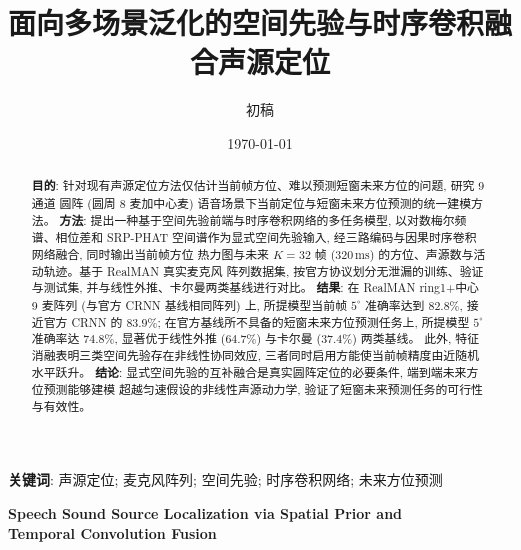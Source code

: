 \documentclass[UTF8,a4paper,11pt]{ctexart}
\title{面向多场景泛化的空间先验与时序卷积融合声源定位}
\author{初稿}
\date{\today}
\begin{document}
\maketitle

\begin{abstract}
\textbf{目的}: 针对现有声源定位方法仅估计当前帧方位、难以预测短窗未来方位的问题, 研究 9 通道
圆阵 (圆周 8 麦加中心麦) 语音场景下当前定位与短窗未来方位预测的统一建模方法。
\textbf{方法}: 提出一种基于空间先验前端与时序卷积网络的多任务模型, 以对数梅尔频谱、相位差和
SRP-PHAT 空间谱作为显式空间先验输入, 经三路编码与因果时序卷积网络融合, 同时输出当前帧方位
热力图与未来 $K{=}32$ 帧 ($320\,\mathrm{ms}$) 的方位、声源数与活动轨迹。基于 RealMAN 真实麦克风
阵列数据集, 按官方协议划分无泄漏的训练、验证与测试集, 并与线性外推、卡尔曼两类基线进行对比。
\textbf{结果}: 在 RealMAN ring1+中心 9 麦阵列 (与官方 CRNN 基线相同阵列) 上, 所提模型当前帧
$5^\circ$ 准确率达到 $82.8\%$, 接近官方 CRNN 的 $83.9\%$; 在官方基线所不具备的短窗未来方位预测任务上,
所提模型 $5^\circ$ 准确率达 $74.8\%$, 显著优于线性外推 ($64.7\%$) 与卡尔曼 ($37.4\%$) 两类基线。
此外, 特征消融表明三类空间先验存在非线性协同效应, 三者同时启用方能使当前帧精度由近随机水平跃升。
\textbf{结论}: 显式空间先验的互补融合是真实圆阵定位的必要条件, 端到端未来方位预测能够建模
超越匀速假设的非线性声源动力学, 验证了短窗未来预测任务的可行性与有效性。
\end{abstract}

\noindent\textbf{关键词}: 声源定位; 麦克风阵列; 空间先验; 时序卷积网络; 未来方位预测

\vspace{0.5em}
\begin{center}
\textbf{Speech Sound Source Localization via Spatial Prior and\\Temporal Convolution Fusion}
\end{center}
\end{document}
